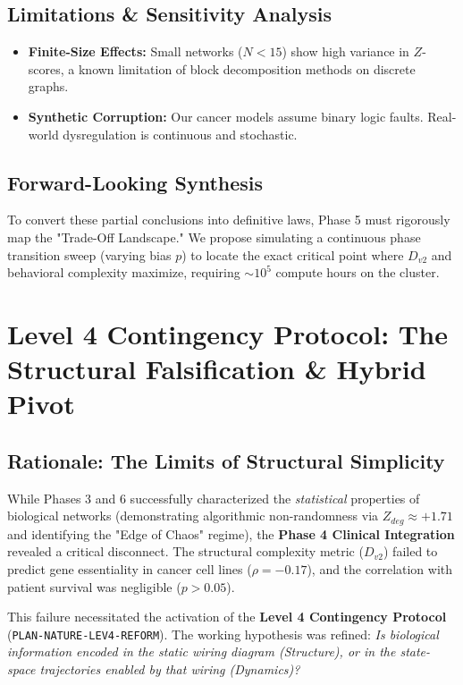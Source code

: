 \documentclass{article}
\begin{document}
\subsection{Limitations \& Sensitivity Analysis}
\begin{itemize}
    \item \textbf{Finite-Size Effects:} Small networks ($N<15$) show high variance in $Z$-scores, a known limitation of block decomposition methods on discrete graphs.
    \item \textbf{Synthetic Corruption:} Our cancer models assume binary logic faults. Real-world dysregulation is continuous and stochastic.
\end{itemize}

\subsection{Forward-Looking Synthesis}
To convert these partial conclusions into definitive laws, Phase 5 must rigorously map the "Trade-Off Landscape." We propose simulating a continuous phase transition sweep (varying bias $p$) to locate the exact critical point where $D_{v2}$ and behavioral complexity maximize, requiring $\sim 10^5$ compute hours on the cluster.

\section{Level 4 Contingency Protocol: The Structural Falsification \& Hybrid Pivot}
\label{sec:level4}

\subsection{Rationale: The Limits of Structural Simplicity}
While Phases 3 and 6 successfully characterized the \textit{statistical} properties of biological networks (demonstrating algorithmic non-randomness via $Z_{deg} \approx +1.71$ and identifying the "Edge of Chaos" regime), the \textbf{Phase 4 Clinical Integration} revealed a critical disconnect. The structural complexity metric ($D_{v2}$) failed to predict gene essentiality in cancer cell lines ($\rho = -0.17$), and the correlation with patient survival was negligible ($p > 0.05$).

This failure necessitated the activation of the \textbf{Level 4 Contingency Protocol} (\texttt{PLAN-NATURE-LEV4-REFORM}). The working hypothesis was refined: \textit{Is biological information encoded in the static wiring diagram (Structure), or in the state-space trajectories enabled by that wiring (Dynamics)?}
\end{document}
